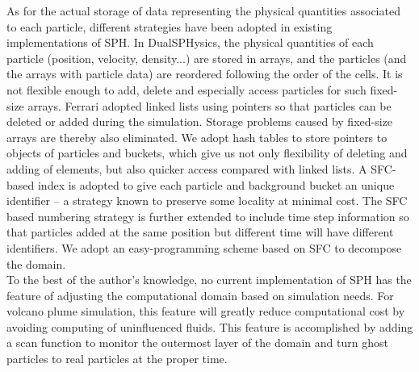 \documentclass[procedia]{easychair}
\begin{document}
As for the actual storage of data representing the physical quantities associated to each particle, different strategies have been adopted in existing implementations of SPH. 
In DualSPHysics\cite{crespo2015dualsphysics}, the physical quantities of each particle (position, velocity, density...) are stored in arrays, and the particles (and the arrays with particle data) are reordered following the order of the cells. It is not flexible enough to add, delete and especially access particles for such fixed-size arrays. Ferrari\cite{ferrari2009new} adopted linked lists using pointers so that particles can be deleted or added during the simulation. Storage problems caused by fixed-size arrays are thereby also eliminated. We adopt hash tables to store pointers to objects of particles and buckets, which give us not only flexibility of deleting and adding of elements, but also quicker access compared with linked lists. A SFC-based index is adopted to give each particle and background bucket an unique identifier -- a strategy known to preserve some locality at minimal cost. The SFC based numbering strategy is further extended to include time step information so that particles added at the same position but different time will have different identifiers. 
We adopt an easy-programming scheme based on SFC \cite{patra1999efficient} to decompose the domain.\\
To the best of the author's knowledge, no current implementation of SPH has the feature of adjusting the computational domain based on simulation needs. For volcano plume simulation, this feature will greatly reduce computational cost by avoiding computing of uninfluenced fluids. This feature is accomplished by adding a scan function to monitor the outermost layer of the domain and turn ghost particles to real particles at the proper time.\\
\end{document}
